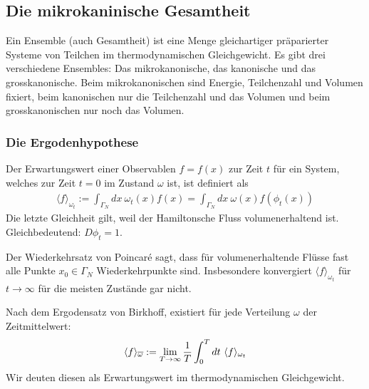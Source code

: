\subsection{Die mikrokaninische Gesamtheit}

\begin{definition}
    Ein Ensemble (auch Gesamtheit) ist eine Menge gleichartiger präparierter
    Systeme von Teilchen im thermodynamischen Gleichgewicht.
    Es gibt drei verschiedene Ensembles: Das mikrokanonische, das kanonische
    und das grosskanonische. Beim mikrokanonischen sind Energie, Teilchenzahl
    und Volumen fixiert, beim kanonischen nur die Teilchenzahl und das Volumen
    und beim grosskanonischen nur noch das Volumen.
\end{definition}

\subsubsection{Die Ergodenhypothese}

\begin{definition}[Erwartungswert]
    Der Erwartungswert einer Observablen $f=f(x)$ zur Zeit $t$ für ein
    System, welches zur Zeit $t=0$ im Zustand $\omega$ ist, ist definiert
    als
    \begin{align*}
        \langle f \rangle_{\omega_t} := \int_{\Gamma_N} d x \ \omega_t(x) f(x)
        = \int_{\Gamma_N} dx \ \omega(x) f(\phi_t(x))
    \end{align*}
    Die letzte Gleichheit gilt, weil der Hamiltonsche Fluss volumenerhaltend ist.
    Gleichbedeutend: $D \phi_t = 1$.
\end{definition}

Der Wiederkehrsatz von Poincaré sagt, dass für volumenerhaltende Flüsse fast
alle Punkte $x_0 \in \Gamma_N$ Wiederkehrpunkte sind. Insbesondere konvergiert
$\langle f \rangle_{\omega_t}$ für $t \rightarrow \infty$ für die meisten
Zustände gar nicht.

\begin{definition}[Zeitmittelwert]
    Nach dem Ergodensatz von Birkhoff, existiert für jede Verteilung $\omega$
    der Zeitmittelwert:
    \begin{align*}
        \langle f \rangle_{\overline{\omega}} :=
        \lim\limits_{T \rightarrow \infty} \frac{1}{T} \int_0^T dt \ \langle f \rangle_{\omega_t}        
    \end{align*}
    Wir deuten diesen als Erwartungswert im thermodynamischen Gleichgewicht.
\end{definition}

